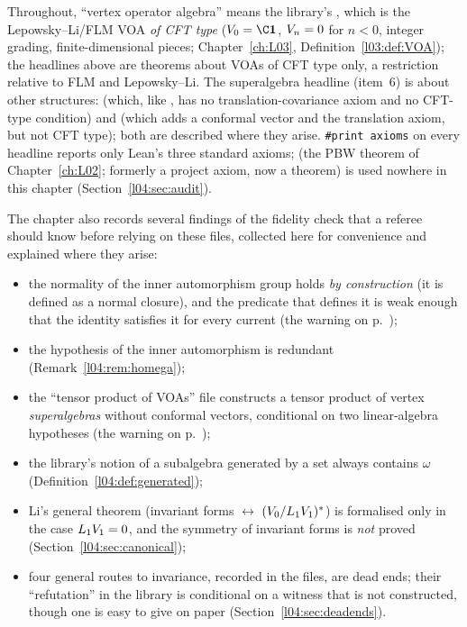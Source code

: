 Throughout, ``vertex operator algebra'' means the library's , which is the
Lepowsky--Li/FLM VOA \emph{of CFT type} ($\lfourV_0 = \C\lfourvac$, $V_n = 0$ for $n<0$, integer grading,
finite-dimensional pieces; Chapter~\ref{ch:L03}, Definition~\ref{l03:def:VOA}); the headlines above are theorems about VOAs
of CFT type only, a restriction relative to FLM and Lepowsky--Li. The superalgebra headline (item~6) is about other
structures:  (which, like , has no translation-covariance axiom and no
CFT-type condition) and  (which adds a conformal vector and the translation axiom, but not CFT type);
both are described where they arise.
\texttt{\#print axioms} on every headline reports only Lean's three standard axioms;  (the PBW theorem of Chapter~\ref{ch:L02}; formerly a project axiom, now a theorem) is used nowhere in this chapter (Section~\ref{l04:sec:audit}).

The chapter also records several findings of the fidelity check that a referee should know before
relying on these files, collected here for convenience and explained where they arise:
\begin{itemize}
\item the normality of the inner automorphism group  holds \emph{by construction} (it is
  defined as a normal closure), and the predicate  that defines it is weak enough
  that the identity satisfies it for every current (the warning on p.~\pageref{l04:warn:inn});
\item the hypothesis  of the inner automorphism  is redundant
  (Remark~\ref{l04:rem:homega});
\item the ``tensor product of VOAs'' file constructs a tensor product of vertex
  \emph{superalgebras} without conformal vectors, conditional on two linear-algebra hypotheses
  (the warning on p.~\pageref{l04:warn:tensor});
\item the library's notion of a subalgebra generated by a set always contains $\omega$
  (Definition~\ref{l04:def:generated});
\item Li's general theorem (invariant forms $\leftrightarrow$ $(V_0/L_1V_1)^*$) is
  formalised only in the case $L_1V_1 = 0$, and the symmetry of invariant forms is
  \emph{not} proved (Section~\ref{l04:sec:canonical});
\item four general routes to invariance, recorded in the files, are dead ends; their
  ``refutation'' in the library is conditional on a witness that is not constructed, though one is
  easy to give on paper (Section~\ref{l04:sec:deadends}).
\end{itemize}

